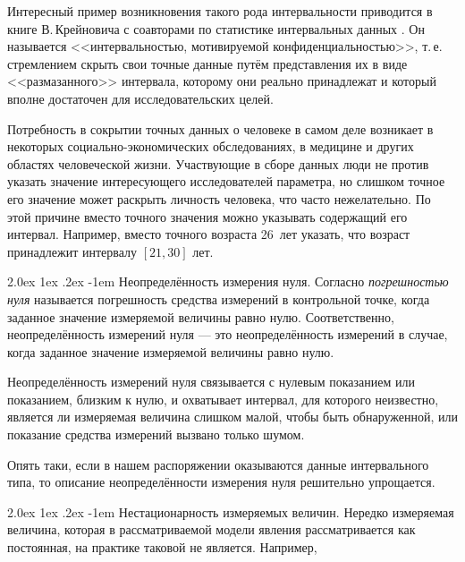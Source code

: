 \documentclass[a5paper,openany]{book}
\makeatletter
\renewcommand\paragraph{\@startsection{paragraph}{4}{\z@}%
                         {2.0ex \@plus1ex \@minus.2ex}%
                         {-1em}%
                         {\normalfont\normalsize\bfseries}}
\makeatother
\begin{document}
Интересный пример возникновения такого рода интервальности приводится 
в книге В.\,Крейновича с соавторами по статистике интервальных данных 
\cite{NguyenKreinWuXiang}. Он называется <<интервальностью, мотивируемой 
конфиденциальностью>>, т.\,е. стремлением скрыть свои точные данные путём 
представления их в виде <<размазанного>>  интервала, которому они реально 
принадлежат и который вполне достаточен для исследовательских целей. 
  
Потребность в сокрытии точных данных о человеке в самом деле возникает в некоторых 
социально-экономических обследованиях, в медицине и других областях человеческой жизни. 
Участвующие в сборе данных люди не против указать значение интересующего исследователей 
параметра, но слишком точное его значение может раскрыть личность человека, что часто 
нежелательно. По этой причине вместо точного значения можно указывать содержащий 
его интервал. Например, вместо точного возраста 26~лет указать, что возраст 
принадлежит интервалу $[21, 30]$ лет. 
    
   
\paragraph{Неопределённость измерения нуля.}
Согласно \cite{RMG29-2013} \emph{погрешностью нуля} называется погрешность средства 
измерений в контрольной точке, когда заданное значение измеряемой величины равно нулю. 
 Соответственно, неопределённость измерений нуля --- это 
неопределённость измерений в случае, когда заданное значение измеряемой величины 
равно нулю. 
  
Неопределённость измерений нуля связывается с нулевым показанием или показанием, близким 
к нулю, и охватывает интервал, для которого неизвестно, является ли измеряемая величина 
слишком малой, чтобы быть обнаруженной, или показание средства измерений вызвано только 
шумом. 
  
Опять таки, если в нашем распоряжении оказываются данные интервального типа, то 
описание неопределённости измерения нуля решительно упрощается. 
  
  
\paragraph{Нестационарность измеряемых величин.} 
Нередко измеряемая величина, которая в рассматриваемой модели явления рассматривается 
как постоянная, на практике таковой не является. Например,  
   
\end{document}
